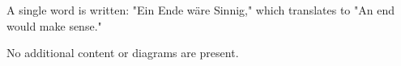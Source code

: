 A single word is written: "Ein Ende wäre Sinnig," which translates to "An end would make sense."  

No additional content or diagrams are present.